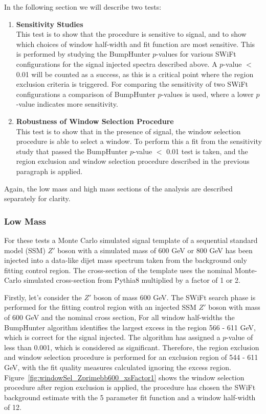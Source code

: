\noindent
In the following section we will describe two tests:
\begin{enumerate}
  \item\textbf{Sensitivity Studies}\\
  This test is to show that the procedure is sensitive to signal,
  and to show which choices of window half-width and fit function are most sensitive.
  This is performed by studying the {\sc BumpHunter} \mbox{$p$-value}s for various SWiFt configurations for the signal injected spectra described above.
  A \mbox{$p$-value} $<$ 0.01 will be counted as a success, as this is a critical point  where the region exclusion criteria is triggered.
  For comparing the sensitivity of two SWiFt configurations a comparison of
  {\sc BumpHunter} \mbox{$p$-value}s is used, where a lower \mbox{$p$-value} indicates more sensitivity.\vspace{1em}
  
  \item\textbf{Robustness of Window Selection Procedure}\\
  This test is to show that in the presence of signal, the window selection procedure is able to select a window.
  To perform this a fit from the sensitivity study that passed the {\sc BumpHunter} \mbox{$p$-value} $<$ 0.01 test is taken,
  and the region exclusion and  window selection procedure described in the previous paragraph is applied.
\end{enumerate}

\noindent
Again, the low mass and high mass sections of the analysis are described separately for clarity.

\subsubsection{Low Mass}
\label{sec:lowmass_signalInj}

For these tests a Monte Carlo simulated signal template of a sequential standard model (SSM) $Z'$ boson with a simulated mass of 600 GeV or 800 GeV
has been injected into a data-like dijet mass spectrum taken from the background only  fitting control region.
The cross-section of the template uses the nominal Monte-Carlo simulated cross-section from { \sc Pythia8} multiplied by a factor of 1 or 2.

Firstly, let's consider the $Z'$ boson of mass 600 GeV.
The SWiFt search phase is performed for the fitting control region with an injected SSM $Z'$ boson with mass of 600 GeV and the nominal cross section,
For all window half-widths the {\sc BumpHunter} algorithm identifies the largest excess in the region 566 - 611 GeV, which is correct for the signal injected.
The algorithm has assigned a \mbox{$p$-value} of less than 0.001, which is considered as significant.
Therefore, the region exclusion and window selection procedure is performed for an exclusion region of 544 - 611 GeV,
with the fit quality measures calculated ignoring the excess region.
Figure~\ref{fig:windowSel_Zprimebb600_xsFactor1} shows the window selection procedure after region exclusion is applied,
the procedure has chosen the SWiFt background estimate with the 5 parameter fit function and a window half-width of 12.


